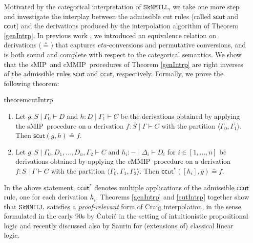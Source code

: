 \documentclass[sn-mathphys-num]{sn-jnl}%
\newcommand{\GG}{\Gamma}
\newcommand{\GD}{\Delta}
\newcommand{\vd}{\vdash}
\newcommand{\bsls}{\backslash}
\newcommand{\SkNMILL}{$\mathtt{SkNMILL}$}
\newcommand{\mf}[1]{\mathsf{#1}}
\newcommand{\sMIP}{\textsf{sMIP}}
\newcommand{\cMMIP}{\textsf{cMMIP}}
\theoremstyle{thmstyleone}%
\theoremstyle{thmstyletwo}%
\theoremstyle{thmstylethree}%
\begin{document}
Motivated by the categorical interpretation of \SkNMILL, we take one more step and investigate the interplay between the admissible cut rules (called $\mf{scut}$ and $\mf{ccut}$) and the derivations produced by the interpolation algorithm of Theorem \ref{genIntrp}.
In previous work \cite{UVW:protsn}, we introduced an equivalence relation on derivations ($\circeq$) that captures $eta$-conversions and permutative conversions, and is both sound and complete with respect to the categorical semantics.
We show that the \sMIP~and \cMMIP~procedures of Theorem \ref{genIntrp} are right inverses of the admissible rules $\mf{scut}$ and $\mf{ccut}$, respectively. Formally, we prove the following theorem:
\begin{restatable*}{theorem}{cutIntrp}\label{cutIntrp}
  ~
  \begin{enumerate}[label=(\roman*)]
    \item Let $g : S \mid \GG_0 \vd D$ and $h : D \mid \GG_1 \vd C$ be the derivations obtained by applying the \sMIP~procedure on a derivation $f: S \mid \GG \vd C$ with the partition $\langle \GG_0 , \GG_1 \rangle$. Then $\mf{scut}(g, h) \circeq f$.
    \item Let $g : S \mid \GG_0 , D_1 , \dots, D_n, \GG_2 \vd C$ and $h_i : {-} \mid \GD_i \vd D_i$ for $i \in [1,\dots , n]$ be derivations obtained by applying the \cMMIP~procedure on a derivation $f: S \mid \GG \vd C$ with the partition $\langle \GG_0 , \GG_1 , \GG_2 \rangle$. Then $\mf{ccut}^*([h_i] , g) \circeq f$.
  \end{enumerate}
\end{restatable*}

In the above statement, $\mf{ccut}^*$ denotes multiple applications of the admissible $\mf{ccut}$ rule, one for each derivation $h_i$.
Theorems \ref{genIntrp} and \ref{cutIntrp} together show that \SkNMILL\ satisfies a \emph{proof-relevant} form of Craig interpolation, in the sense  formulated in the early 90s by {\v{C}}ubri{\'c} \cite{Cubric1994} in the setting of intuitionistic propositional logic and recently discussed also by Saurin \cite{Saurin2024} for (extensions of) classical linear logic.

\end{document}
